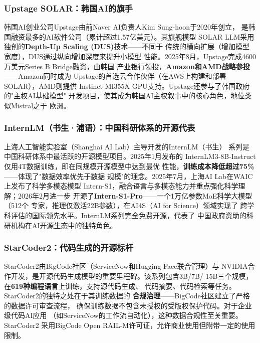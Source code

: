 \subsubsection{Upstage SOLAR：韩国AI的旗手}
韩国AI创业公司Upstage由前Naver AI负责人Kim Sung-hoon于2020年创立，
是韩国融资最多的AI软件公司（累计超过1.57亿美元）。其旗舰模型
SOLAR LLM采用独创的\textbf{Depth-Up Scaling (DUS)}技术——不同于
传统的横向扩展（增加模型宽度），DUS通过纵向增加深度来提升小模型
性能。2025年8月，Upstage完成4600万美元Series B Bridge融资，由韩国
产业银行领投，\textbf{Amazon和AMD战略参投}——Amazon同时成为
Upstage的首选云合作伙伴（在AWS上构建和部署SOLAR），AMD则提供
Instinct MI355X GPU支持。Upstage还参与了韩国政府的"主权AI基础模型"
开发项目，使其成为韩国AI主权叙事中的核心角色，地位类似Mistral之于
欧洲。

\subsubsection{InternLM（书生·浦语）：中国科研体系的开源代表}
上海人工智能实验室（Shanghai AI Lab）主导开发的InternLM（书生）
系列是中国科研体系中最活跃的开源模型项目。2025年1月发布的
InternLM3-8B-Instruct仅用4T数据训练，即在同规模开源模型中达到最优
性能，\textbf{训练成本降低超过75\%}——体现了"数据效率优先于数据
规模"的理念。2025年7月，上海AI Lab在WAIC上发布了科学多模态模型
Intern-S1，融合语言与多模态能力并重点强化科学理解；2026年2月进一步
开源了\textbf{Intern-S1-Pro}——一个1万亿参数MoE科学大模型（512个
专家，推理仅激活22B参数），在AI4S（AI for Science）领域实现了
跨学科评估的国际领先水平。InternLM系列完全免费开源，代表了
中国政府资助的科研机构在AI开源生态中的独特角色。

\subsubsection{StarCoder2：代码生成的开源标杆}
StarCoder2由BigCode社区（ServiceNow和Hugging Face联合管理）与
NVIDIA合作开发，是开源代码生成模型的重要里程碑。该系列包含3B/7B/
15B三个规模，在\textbf{619种编程语言}上训练，支持源代码生成、
代码摘要、代码检索等任务。StarCoder2的独特之处在于其训练数据的
\textbf{合规治理}——BigCode社区建立了严格的数据许可审查流程，
确保训练数据不包含未授权的受版权保护代码。对于企业级代码AI应用
（如ServiceNow的工作流自动化），这种数据合规性至关重要。StarCoder2
采用BigCode Open RAIL-M许可证，允许商业使用但附带一定的使用限制。

